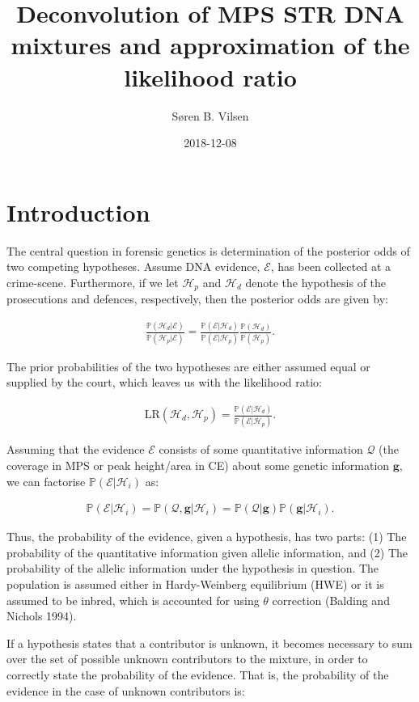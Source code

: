 \documentclass[]{article}
\title{Deconvolution of MPS STR DNA mixtures and approximation of the
likelihood ratio}
\author{Søren B. Vilsen}
\date{2018-12-08}
\newcommand{\bs}[1]{\ensuremath{\boldsymbol{#1}}}
\newcommand{\mc}[1]{\ensuremath{\mathcal{#1}}}
\newcommand{\mcg}{\ensuremath{g}}
\newcommand{\p}[1]{\ensuremath{\mathbb{P}\left(#1\right)}}
\begin{document}
\maketitle

\section{Introduction}\label{introduction}

The central question in forensic genetics is determination of the
posterior odds of two competing hypotheses. Assume DNA evidence,
\(\mc E\), has been collected at a crime-scene. Furthermore, if we let
\(\mc H_p\) and \(\mc H_d\) denote the hypothesis of the prosecutions
and defences, respectively, then the posterior odds are given by:

\begin{align}
\frac{\p{\mc H_d|\mc E}}{\p{\mc H_p|\mc E}} = \frac{\p{\mc E|\mc H_d}}{\p{\mc E|\mc H_p}}\frac{\p{\mc H_d}}{\p{\mc H_p}}.
\end{align}

The prior probabilities of the two hypotheses are either assumed equal
or supplied by the court, which leaves us with the likelihood ratio:

\begin{align}
\text{LR}(\mc H_d, \mc H_p) = \frac{\p{\mc E|\mc H_d}}{\p{\mc E|\mc H_p}}.
\end{align}

Assuming that the evidence \(\mc E\) consists of some quantitative
information \(\bs{\mc Q}\) (the coverage in MPS or peak height/area in
CE) about some genetic information \(\bs \mcg\), we can factorise
\(\p{\mc E|\mc H_i}\) as:

\begin{align}
\p{\mc E|\mc H_i} = \p{\bs{\mc Q}, \bs \mcg|\mc H_i} = \p{\bs{\mc Q}|\bs \mcg}\p{\bs \mcg|\mc H_i}.
\end{align}

Thus, the probability of the evidence, given a hypothesis, has two
parts: (1) The probability of the quantitative information given allelic
information, and (2) The probability of the allelic information under
the hypothesis in question. The population is assumed either in
Hardy-Weinberg equilibrium (HWE) or it is assumed to be inbred, which is
accounted for using \(\theta\) correction (Balding and Nichols 1994).

If a hypothesis states that a contributor is unknown, it becomes
necessary to sum over the set of possible unknown contributors to the
mixture, in order to correctly state the probability of the evidence.
That is, the probability of the evidence in the case of unknown
contributors is:
\end{document}
